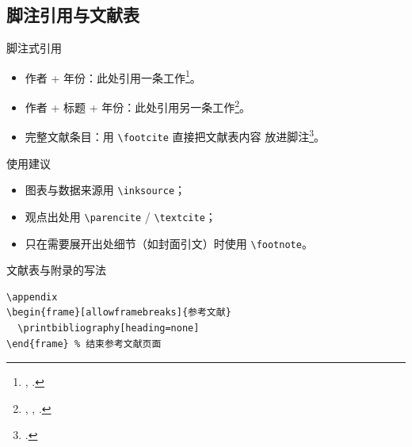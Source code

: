 \subsection{脚注引用与文献表}
\begin{frame}{脚注式引用}
  \begin{itemize}
    \item 作者 + 年份：此处引用一条工作\footnote{\citeauthor{example2026},
      \citeyear{example2026}.}。
    \item 作者 + 标题 + 年份：此处引用另一条工作\footnote{\citeauthor{example2026},
      , \citeyear{example2026}.}。
    \item 完整文献条目：用 \texttt{\textbackslash footcite} 直接把文献表内容
      放进脚注\footcite{example2026}。
  \end{itemize}

  \begin{alertblock}{使用建议}
    \begin{itemize}
      \item 图表与数据来源用 \texttt{\textbackslash inksource}；
      \item 观点出处用 \texttt{\textbackslash parencite} / \texttt{\textbackslash textcite}；
      \item 只在需要展开出处细节（如封面引文）时使用 \texttt{\textbackslash footnote}。
    \end{itemize}
  \end{alertblock}
\end{frame}

\begin{frame}[fragile]{文献表与附录的写法}
  \begin{verbatim}
\appendix
\begin{frame}[allowframebreaks]{参考文献}
  \printbibliography[heading=none]
\end{frame} % 结束参考文献页面
  \end{verbatim}
\end{frame}

